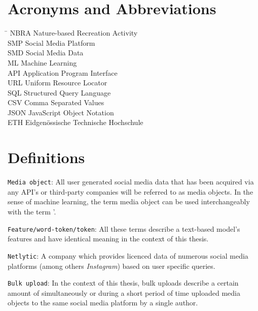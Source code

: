 
\section*{Acronyms and Abbreviations}
\begin{tabbing}
 \hspace*{1.6cm}  \= \kill
 NBRA \> Nature-based Recreation Activity \\[0.5ex]
 SMP \> Social Media Platform \\
 SMD \> Social Media Data \\
 ML \> Machine Learning \\
 API \> Application Program Interface \\
 URL \> Uniform Resource Locator \\
 SQL \> Structured Query Language \\
 CSV \> Comma Separated Values \\
 JSON \> JavaScript Object Notation \\
 ETH \> Eidgen\"{o}ssische Technische Hochschule
\end{tabbing}

\section*{Definitions}
\texttt{Media object}: All user generated social media data that has been acquired via any API\rq s or third-party companies will be referred to as media objects. In the sense of machine learning, the term media object can be used interchangeably with the term \lqdocument\rq.\newline

\texttt{Feature/word-token/token}: All these terms describe a text-based model\rq s features and have identical meaning in the context of this thesis.\newline

\texttt{Netlytic}: A company which provides licenced data of numerous social media platforms (among others \textit{Instagram}) based on user specific queries.\newline

\texttt{Bulk upload}: In the context of this thesis, bulk uploads describe a certain amount of simultaneously or during a short period of time uploaded media objects to the same social media platform by a single author.\newline




 \cleardoublepage

